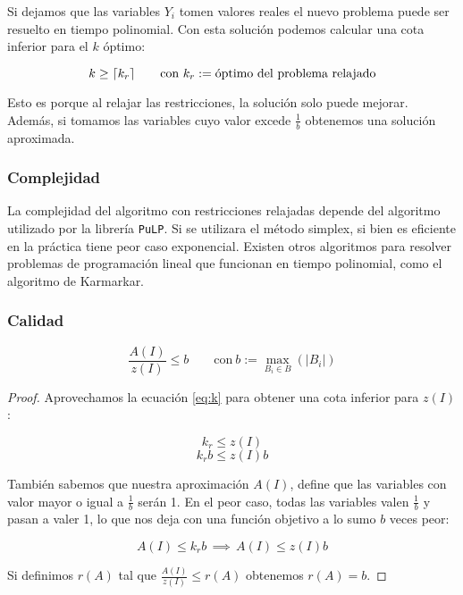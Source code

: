 Si dejamos que las variables $Y_i$ tomen valores reales el nuevo problema puede
ser resuelto en tiempo polinomial. Con esta solución podemos calcular una cota
inferior para el $k$ óptimo:

\begin{equation}
    \label{eq:k}
    k \ge \lceil k_r\rceil \qquad \text{con} \ k_r := \text{óptimo del problema
    relajado}
\end{equation}

Esto es porque al relajar las restricciones, la solución solo puede mejorar.
Además, si tomamos las variables cuyo valor excede $\frac{1}{b}$ obtenemos una
solución aproximada.

\subsubsection{Complejidad}

La complejidad del algoritmo con restricciones relajadas depende del algoritmo
utilizado por la librería \texttt{PuLP}. Si se utilizara el método simplex, si
bien es eficiente en la práctica tiene peor caso exponencial. Existen otros
algoritmos para resolver problemas de programación lineal que funcionan en
tiempo polinomial, como el algoritmo de Karmarkar.

\subsubsection{Calidad}

\[ \frac{A(I)}{z(I)} \le b \qquad \text{con} \ b := \max_{B_i \in B}(|B_i|) \]

\newpage

\begin{proof}

    Aprovechamos la ecuación \eqref{eq:k} para obtener una cota inferior para
    $z(I)$:

    \[ k_r \le z(I) \]
    \[ k_r b \le z(I) b \]

    También sabemos que nuestra aproximación $A(I)$, define que las variables
    con valor mayor o igual a $\frac{1}{b}$ serán 1. En el peor caso, todas las
    variables valen $\frac{1}{b}$ y pasan a valer 1, lo que nos deja con una
    función objetivo a lo sumo $b$ veces peor:

    \[ A(I) \le k_r b \, \implies \, A(I) \le z(I) b \]

    Si definimos $r(A)$ tal que $\frac{A(I)}{z(I)} \le r(A)$ obtenemos $r(A) =
    b$.
\end{proof}
